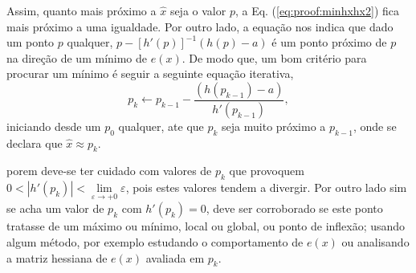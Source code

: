 \begin{myproofT}
Assim, quanto mais próximo a $\hat{x}$ seja  o valor $p$, 
a Eq. (\ref{eq:proof:minhxhx2}) fica mais próximo a uma igualdade. Por outro lado,
a equação nos indica que dado um ponto  $p$ qualquer,
$p - \left[ h'(p) \right]^{-1}\left(h(p)-a\right)$
é um ponto próximo de $p$  na direção de um mínimo de $e(x)$.
De modo que, um bom critério para procurar um mínimo é seguir a seguinte 
equação iterativa,
\begin{equation}\label{eq:proof:minhxhx3}
p_{k} \leftarrow p_{k-1} - \frac{ \left(h(p_{k-1})-a\right)}{h'(p_{k-1})},
\end{equation}
iniciando desde um $p_{0}$ qualquer, ate que $p_{k}$ seja muito próximo a $p_{k-1}$,
onde se declara que $\hat{x} \approx p_{k}$. 


porem deve-se ter cuidado com valores de $p_{k}$ que provoquem 
$0<|h'(p_{k})|<\lim\limits_{\varepsilon \rightarrow +0}\varepsilon$,
pois estes valores tendem a divergir. Por outro lado sim se acha um valor 
de $p_{k}$ com $h'(p_{k})= 0$, deve ser
corroborado se este ponto tratasse de um máximo ou mínimo, local ou global, ou ponto de inflexão;
usando algum método, por exemplo estudando o comportamento 
de $e(x)$ ou analisando a matriz hessiana de $e(x)$ avaliada em $p_{k}$.

\end{myproofT}





